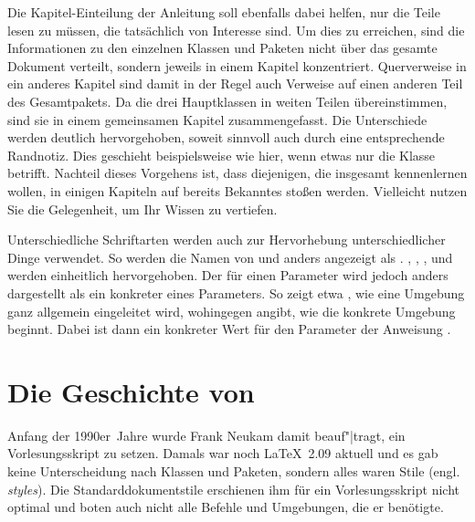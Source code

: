Die Kapitel-Einteilung der Anleitung soll ebenfalls dabei
helfen, nur die Teile lesen zu müssen, die tatsächlich von Interesse sind. Um
dies zu erreichen, sind die Informationen zu den einzelnen Klassen und Paketen
nicht über das gesamte Dokument verteilt, sondern jeweils in einem Kapitel
konzentriert. Querverweise in ein anderes Kapitel sind damit in der Regel auch
Verweise auf einen anderen Teil des Gesamtpakets. Da die drei Hauptklassen in
weiten Teilen übereinstimmen, sind sie in einem gemeinsamen Kapitel
zusammengefasst. Die Unterschiede werden deutlich hervorgehoben, soweit
sinnvoll auch durch eine entsprechende Randnotiz. Dies geschieht
beispielsweise wie hier, wenn etwas nur die Klasse
 betrifft. Nachteil dieses Vorgehens
ist, dass diejenigen, die \KOMAScript{} insgesamt kennenlernen wollen, in
einigen Kapiteln auf bereits Bekanntes stoßen werden. Vielleicht nutzen Sie
die Gelegenheit, um Ihr Wissen zu vertiefen.

Unterschiedliche Schriftarten werden auch zur Hervorhebung unterschiedlicher
Dinge verwendet. So werden die Namen von  und 
anders angezeigt als . , ,
,  und
 werden einheitlich hervorgehoben. Der
 für einen Parameter wird jedoch anders dargestellt als ein
konkreter  eines Parameters. So zeigt etwa
, wie eine Umgebung ganz allgemein
eingeleitet wird, wohingegen  angibt, wie die
konkrete Umgebung  beginnt. Dabei ist dann
 ein konkreter Wert für den Parameter 
der Anweisung .

\section{Die Geschichte von \KOMAScript}

  Anfang der 1990er~Jahre wurde Frank Neukam damit beauf"|tragt, ein
  Vorlesungsskript zu setzen. Damals war noch \LaTeX~2.09 aktuell und
  es gab keine Unterscheidung nach Klassen und Paketen, sondern alles
  waren Stile (engl. \emph{styles}). Die Standarddokumentstile
  erschienen ihm für ein Vorlesungsskript nicht optimal und boten auch
  nicht alle Befehle und Umgebungen, die er benötigte.
  
